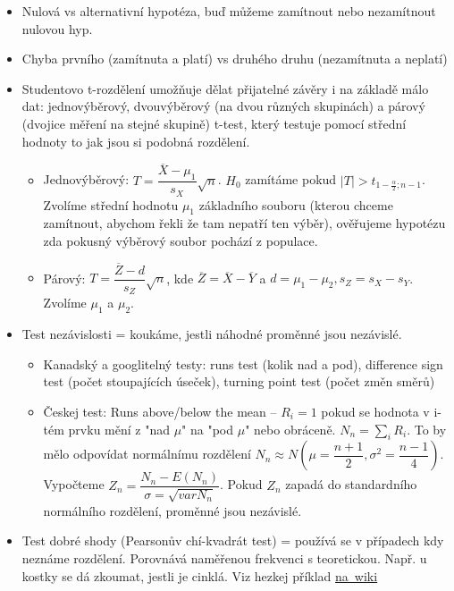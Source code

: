 \documentclass[a4paper,hidelinks]{article}
\begin{document}
\begin{itemize}
    \item Nulová vs alternativní hypotéza, buď můžeme zamítnout nebo nezamítnout nulovou hyp.
    \item Chyba prvního (zamítnuta a platí) vs druhého druhu (nezamítnuta a neplatí)
    \item Studentovo t-rozdělení umožňuje dělat přijatelné závěry i na základě málo dat: jednovýběrový, dvouvýběrový (na dvou různých skupinách) a párový (dvojice měření na stejné skupině) t-test, který testuje pomocí střední hodnoty to jak jsou si podobná rozdělení.
    \begin{itemize}
        \item Jednovýběrový: $T = \dfrac{\overline{X} - \mu_1}{s_X} \sqrt{n}$. $H_0$ zamítáme pokud $|T| > t_{1 - \frac{\alpha}{2};n-1}$. Zvolíme střední hodnotu $\mu_1$ základního souboru (kterou chceme zamítnout, abychom řekli že tam nepatří ten výběr), ověřujeme hypotézu zda pokusný výběrový soubor pochází z populace.
        \item Párový: $T = \dfrac{\overline{Z} - d}{s_Z} \sqrt{n}$, kde $\overline{Z} = \overline{X} - \overline{Y}$ a $d = \mu_1 - \mu_2, s_Z = s_X - s_Y$. Zvolíme $\mu_1$ a $\mu_2$.
    \end{itemize}
    \item Test nezávislosti = koukáme, jestli náhodné proměnné jsou nezávislé.
    \begin{itemize}
        \item Kanadský a googlitelný testy: runs test (kolik nad a pod), difference sign test (počet stoupajících úseček), turning point test (počet změn směrů)
        \item Českej test: Runs above/below the mean -- $R_i = 1$ pokud se hodnota v i-tém prvku mění z "nad $\mu$" na "pod $\mu$" nebo obráceně. $N_n = \sum_i R_i$. To by mělo odpovídat normálnímu rozdělení $N_n \approx N(\mu = \dfrac{n + 1}{2}, \sigma^2 = \dfrac{n - 1}{4})$. Vypočteme $Z_n = \dfrac{N_n - E(N_n)}{\sigma = \sqrt{varN_n}}$. Pokud $Z_n$ zapadá do standardního normálního rozdělení, proměnné jsou nezávislé.
    \end{itemize}
    \item Test dobré shody (Pearsonův chí-kvadrát test) = používá se v případech kdy neznáme rozdělení. Porovnává naměřenou frekvenci s teoretickou. Např. u kostky se dá zkoumat, jestli je cinklá. Viz hezkej příklad \href{https://en.wikipedia.org/wiki/Pearson\%27s_chi-squared_test\#Examples}{na~wiki}
\end{itemize}
\end{document}
